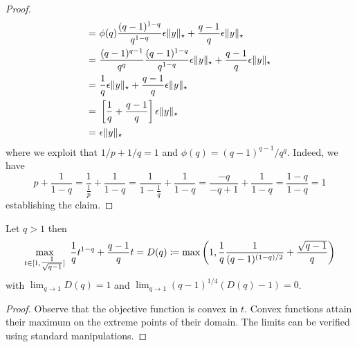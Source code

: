 \begin{proof}
\begin{align*}
  = ~&\phi(q) \frac{(q-1)^{1-q}}{q^{1-q}} \epsilon \| y \|_\star +\frac{q-1}{q} \epsilon \| y \|_\star\\
  = ~&\frac{(q-1)^{q-1}}{q^q} \frac{(q-1)^{1-q}}{q^{1-q}} \epsilon \| y \|_\star +\frac{q-1}{q} \epsilon \| y \|_\star\\
  = ~&\frac{1}{q} \epsilon \| y \|_\star +\frac{q-1}{q} \epsilon \| y \|_\star\\
  = ~&\left[\frac{1}{q}  +\frac{q-1}{q} \right] \epsilon \| y \|_\star\\
  = ~ & \epsilon \| y \|_\star
\end{align*}
where we exploit that $1/p+1/q=1$ and $\phi(q)=(q-1)^{q-1}/q^q$. Indeed, we have
\[
  p+\frac{1}{1-q} = \frac{1}{\frac{1}{p}} + \frac{1}{1-q} = \frac{1}{1-\frac{1}{q}}+\frac{1}{1-q} = \frac{-q}{-q+1}+\frac{1}{1-q}=\frac{1-q}{1-q}=1
\]
establishing the claim.
%
\end{proof}

\begin{lemma}
  \label{lemma:dual-helper-II}
  Let $q>1$ then
  \[
    \max_{t\in [1, \tfrac{1}{\sqrt{q-1}}]} ~\frac{1}{q} t^{1-q} +\frac{q-1}{q} t = D(q)\coloneqq \max\left(1, \frac{1}{q} \frac{1}{(q-1)^{(1-q)/2}} +\frac{\sqrt{q-1}}{q}\right)
  \]
  with $\lim_{q\to 1} D(q)=1$ and $\lim_{q\to 1} (q-1)^{1/4} \left(D(q)-1\right)=0$.
\end{lemma}
\begin{proof}
  Observe that the objective function is convex in $t$. Convex functions attain their maximum on the extreme points of their domain. The limits can be verified using standard manipulations.
\end{proof}


